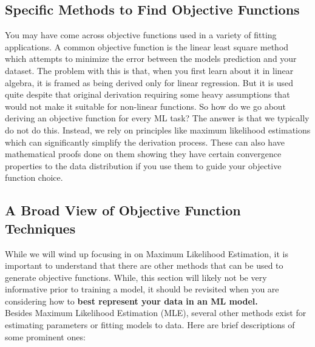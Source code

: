 \documentclass{article}
\begin{document}
\subsection{Specific Methods to Find Objective Functions}
You may have come across objective functions used in a variety of fitting applications. A common objective function is the linear least square method which attempts to minimize the error between the models prediction and your dataset. The problem with this is that, when you first learn about it in linear algebra, it is framed as being derived only for linear regression. But it is used quite despite that original derivation requiring some heavy assumptions that would not make it suitable for non-linear functions. So how do we go about deriving an objective function for every ML task? The answer is that we typically do not do this. Instead, we rely on principles like maximum likelihood estimations which can significantly simplify the derivation process. These can also have mathematical proofs done on them showing they have certain convergence properties to the data distribution if you use them to guide your objective function choice.

\subsection{A Broad View of Objective Function Techniques}

While we will wind up focusing in on Maximum Likelihood Estimation, it is important to understand that there are other methods that can be used to generate objective functions. While, this section will likely not be very informative prior to training a model, it should be revisited when you are considering how to \textbf{best represent your data in an ML model.}\\
Besides Maximum Likelihood Estimation (MLE), several other methods exist for estimating parameters or fitting models to data. Here are brief descriptions of some prominent ones:
\end{document}
